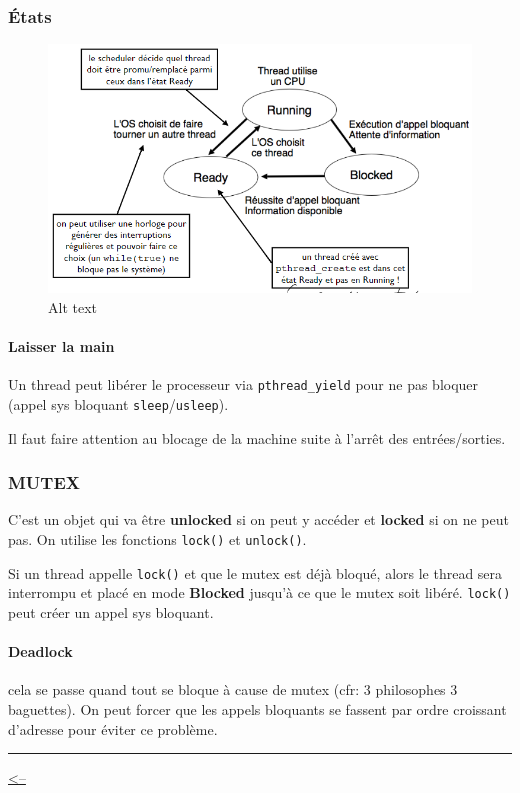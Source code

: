 \subsubsection{États}\label{uxe9tats}

\begin{figure}
\centering
\includegraphics{image-24.png}
\caption{Alt text}
\end{figure}

\paragraph{Laisser la main}\label{laisser-la-main}

Un thread peut libérer le processeur via \texttt{pthread\_yield} pour ne
pas bloquer (appel sys bloquant \texttt{sleep}/\texttt{usleep}).

Il faut faire attention au blocage de la machine suite à l'arrêt des
entrées/sorties.

\subsubsection{MUTEX}\label{mutex}

C'est un objet qui va être \textbf{unlocked} si on peut y accéder et
\textbf{locked} si on ne peut pas. On utilise les fonctions
\texttt{lock()} et \texttt{unlock()}.

Si un thread appelle \texttt{lock()} et que le mutex est déjà bloqué,
alors le thread sera interrompu et placé en mode \textbf{Blocked}
jusqu'à ce que le mutex soit libéré. \texttt{lock()} peut créer un appel
sys bloquant.

\paragraph{Deadlock}\label{deadlock}

cela se passe quand tout se bloque à cause de mutex (cfr: 3 philosophes
3 baguettes). On peut forcer que les appels bloquants se fassent par
ordre croissant d'adresse pour éviter ce problème.

\begin{center}\rule{0.5\linewidth}{0.5pt}\end{center}

\href{../README.md}{\textless--}
